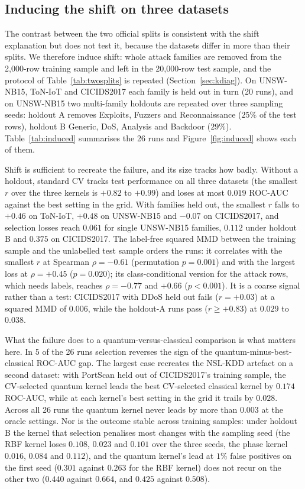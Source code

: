 \subsection{Inducing the shift on three datasets}\label{sec:kinduced}
The contrast between the two official splits is consistent with the shift explanation but does not test
it, because the datasets differ in more than their splits. We therefore induce shift: whole attack
families are removed from the 2{,}000-row training sample and left in the 20{,}000-row test sample, and
the protocol of Table~\ref{tab:twosplits} is repeated (Section~\ref{sec:kdiag}). On UNSW-NB15, ToN-IoT
and CICIDS2017 each family is held out in turn (20 runs), and on UNSW-NB15 two multi-family holdouts are
repeated over three sampling seeds: holdout A removes Exploits, Fuzzers and Reconnaissance ($25\%$ of the
test rows), holdout B Generic, DoS, Analysis and Backdoor ($29\%$). Table~\ref{tab:induced} summarises
the 26 runs and Figure~\ref{fig:induced} shows each of them.

Shift is sufficient to recreate the failure, and its size tracks how badly. Without a holdout, standard
CV tracks test performance on all three datasets (the smallest $r$ over the three kernels is $+0.82$ to
$+0.99$) and loses at most $0.019$ ROC-AUC against the best setting in the grid. With families held out,
the smallest $r$ falls to $+0.46$ on ToN-IoT, $+0.48$ on UNSW-NB15 and $-0.07$ on CICIDS2017, and
selection losses reach $0.061$ for single UNSW-NB15 families, $0.112$ under holdout B and $0.375$ on
CICIDS2017. The label-free squared MMD between the training sample and the unlabelled test sample orders
the runs: it correlates with the smallest $r$ at Spearman $\rho=-0.61$ (permutation $p=0.001$) and with
the largest loss at $\rho=+0.45$ ($p=0.020$); its class-conditional version for the attack rows, which
needs labels, reaches $\rho=-0.77$ and $+0.66$ ($p<0.001$). It is a coarse signal rather than a test:
CICIDS2017 with DDoS held out fails ($r=+0.03$) at a squared MMD of $0.006$, while the holdout-A runs pass
($r\ge+0.83$) at $0.029$ to $0.038$.

What the failure does to a quantum-versus-classical comparison is what matters here. In 5 of the 26 runs
selection reverses the sign of the quantum-minus-best-classical ROC-AUC gap. The largest case recreates
the NSL-KDD artefact on a second dataset: with PortScan held out of CICIDS2017's training sample, the
CV-selected quantum kernel leads the best CV-selected classical kernel by $0.174$ ROC-AUC, while at each
kernel's best setting in the grid it trails by $0.028$. Across all 26 runs the quantum kernel never leads
by more than $0.003$ at the oracle settings. Nor is the outcome stable across training samples: under
holdout B the kernel that selection penalises most changes with the sampling seed (the RBF kernel loses
$0.108$, $0.023$ and $0.101$ over the three seeds, the phase kernel $0.016$, $0.084$ and $0.112$), and
the quantum kernel's lead at $1\%$ false positives on the first seed ($0.301$ against $0.263$ for the RBF
kernel) does not recur on the other two ($0.440$ against $0.664$, and $0.425$ against $0.508$).

